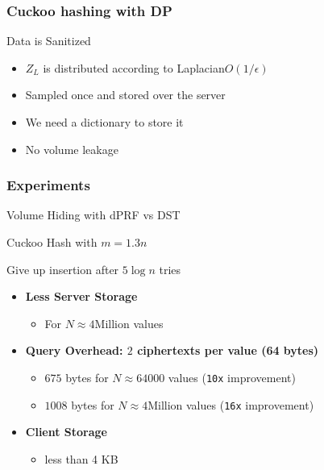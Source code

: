 \documentclass[]{beamer}
\begin{document}
\begin{frame}
\frametitle{Cuckoo hashing with DP}


\begin{block}{Data is Sanitized}
\begin{itemize}[<+->]
\item 
$Z_L$ is distributed according to Laplacian$O(1/\epsilon)$

\item 
Sampled once and stored over the server

\item 
We need a dictionary to store it

\item 
No volume leakage 
\end{itemize}
\end{block}

\end{frame}


\begin{frame}
\frametitle{Experiments}
\pause
\begin{block}{Volume Hiding with dPRF vs DST}

{\color{brown}
Cuckoo Hash with $m=1.3n$

Give up insertion after $5\log n$ tries
}


\begin{itemize}[<+->]
\item {\color{blue} \bf Less Server Storage}
    \begin{itemize}
        \item {\color{blue} For $N\approx 4$Million values}

    \end{itemize}
\item {\color{blue} \bf Query Overhead: $2$ ciphertexts per value (64 bytes)}
    \begin{itemize}
        \item {\color{red} $675$ bytes for $N\approx 64000$ values ({\tt 10x} improvement)}
        \item {\color{red} $1008$ bytes for $N\approx 4$Million values ({\tt 16x} improvement)}
    \end{itemize}
\item {\color{blue} \bf Client Storage}
    \begin{itemize}
        \item {\color{red} less than 4 KB}
    \end{itemize}

\end{itemize}
\end{block}
\end{frame}
\end{document}
